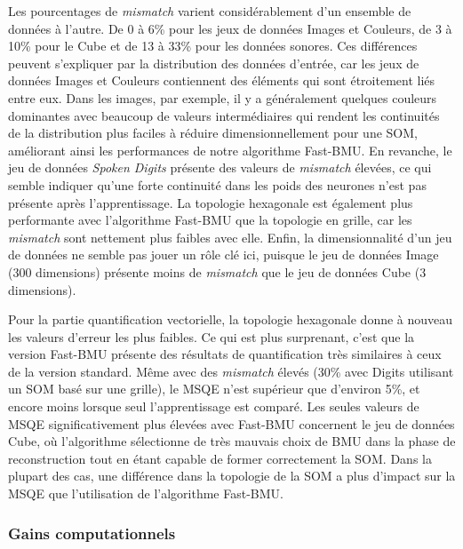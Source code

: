 	Les pourcentages de \textit{mismatch} varient considérablement d'un ensemble de données à l'autre. De 0 à 6\% pour les jeux de données Images et Couleurs, de 3 à 10\% pour le Cube et de 13 à 33\% pour les données sonores. Ces différences peuvent s'expliquer par la distribution des données d'entrée, car les jeux de données Images et Couleurs contiennent des éléments qui sont étroitement liés entre eux. Dans les images, par exemple, il y a généralement quelques couleurs dominantes avec beaucoup de valeurs intermédiaires qui rendent les continuités de la distribution plus faciles à réduire dimensionnellement pour une SOM, améliorant ainsi les performances de notre algorithme Fast-BMU. En revanche, le jeu de données \textit{Spoken Digits} présente des valeurs de \textit{mismatch} élevées, ce qui semble indiquer qu'une forte continuité dans les poids des neurones n'est pas présente après l'apprentissage. La topologie hexagonale est également plus performante avec l'algorithme Fast-BMU que la topologie en grille, car les \textit{mismatch} sont nettement plus faibles avec elle. Enfin, la dimensionnalité d'un jeu de données ne semble pas jouer un rôle clé ici, puisque le jeu de données Image (300 dimensions) présente moins de \textit{mismatch} que le jeu de données Cube (3 dimensions).

	Pour la partie quantification vectorielle, la topologie hexagonale donne à nouveau les valeurs d'erreur les plus faibles. Ce qui est plus surprenant, c'est que la version Fast-BMU présente des résultats de quantification très similaires à ceux de la version standard. Même avec des \textit{mismatch} élevés (30\% avec Digits utilisant un SOM basé sur une grille), le MSQE n'est supérieur que d'environ 5\%, et encore moins lorsque seul l'apprentissage est comparé. Les seules valeurs de MSQE significativement plus élevées avec Fast-BMU concernent le jeu de données Cube, où l'algorithme sélectionne de très mauvais choix de BMU dans la phase de reconstruction tout en étant capable de former correctement la SOM. Dans la plupart des cas, une différence dans la topologie de la SOM a plus d'impact sur la MSQE que l'utilisation de l'algorithme Fast-BMU.

	\subsubsection{Gains computationnels}\label{fast:seq:gain_comput}

